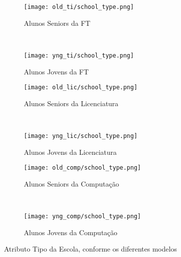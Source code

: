 \clearpage
\begin{figure}[!ht]
    \centering
    \begin{subfigure}[b]{0.48\textwidth}
        \centering
        \texttt{[image: old\_ti/school\_type.png]}
        \caption{Alunos Seniors da FT}
    \end{subfigure}
    ~
    \begin{subfigure}[b]{0.48\textwidth}
        \centering
        \texttt{[image: yng\_ti/school\_type.png]}
        \caption{Alunos Jovens da FT}
    \end{subfigure}

    \begin{subfigure}[b]{0.48\textwidth}
        \centering
        \texttt{[image: old\_lic/school\_type.png]}
        \caption{Alunos Seniors da Licenciatura}
    \end{subfigure}
    ~
    \begin{subfigure}[b]{0.48\textwidth}
        \centering
        \texttt{[image: yng\_lic/school\_type.png]}
        \caption{Alunos Jovens da Licenciatura}
    \end{subfigure}

    \begin{subfigure}[b]{0.48\textwidth}
        \centering
        \texttt{[image: old\_comp/school\_type.png]}
        \caption{Alunos Seniors da Computação}
    \end{subfigure}
    ~
    \begin{subfigure}[b]{0.48\textwidth}
        \centering
        \texttt{[image: yng\_comp/school\_type.png]}
        \caption{Alunos Jovens da Computação}
    \end{subfigure}
    \caption{Atributo Tipo da Escola, conforme os diferentes modelos}
\end{figure}

